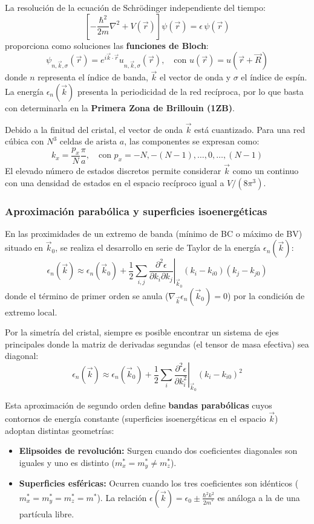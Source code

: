 La resolución de la ecuación de Schrödinger independiente del tiempo:
\[
\left[ -\frac{\hbar^2}{2m} \nabla^2 + V(\vec{r}) \right] \psi(\vec{r}) = \epsilon \, \psi(\vec{r})
\]
proporciona como soluciones las \textbf{funciones de Bloch}:
\[
\psi_{n,\vec{k},\sigma}(\vec{r}) = e^{i \vec{k} \cdot \vec{r}} u_{n,\vec{k},\sigma}(\vec{r}), \quad \text{con } u(\vec{r}) = u(\vec{r} + \vec{R})
\]
donde $n$ representa el índice de banda, $\vec{k}$ el vector de onda y $\sigma$ el índice de espín. La energía $\epsilon_n(\vec{k})$ presenta la periodicidad de la red recíproca, por lo que basta con determinarla en la \textbf{Primera Zona de Brillouin (1ZB)}.

Debido a la finitud del cristal, el vector de onda $\vec{k}$ está cuantizado. Para una red cúbica con $N^3$ celdas de arista $a$, las componentes se expresan como:
\[
k_x = \frac{p_x}{N} \frac{\pi}{a}, \quad \text{con } p_x = -N, -(N-1), \dots, 0, \dots, (N-1)
\]
El elevado número de estados discretos permite considerar $\vec{k}$ como un continuo con una densidad de estados en el espacio recíproco igual a $V / (8\pi^3)$.

\subsubsection{Aproximación parabólica y superficies isoenergéticas}
En las proximidades de un extremo de banda (mínimo de BC o máximo de BV) situado en $\vec{k}_0$, se realiza el desarrollo en serie de Taylor de la energía $\epsilon_n(\vec{k})$:
\[
\epsilon_n(\vec{k}) \approx \epsilon_n(\vec{k}_0) + \frac{1}{2} \sum_{i,j} \left. \frac{\partial^2 \epsilon}{\partial k_i \partial k_j} \right|_{\vec{k}_0} (k_i - k_{i0})(k_j - k_{j0})
\]
donde el término de primer orden se anula ($\nabla_{\vec{k}} \epsilon_n(\vec{k}_0) = 0$) por la condición de extremo local.

Por la simetría del cristal, siempre es posible encontrar un sistema de ejes principales donde la matriz de derivadas segundas (el tensor de masa efectiva) sea diagonal:
\[
\epsilon_n(\vec{k}) \approx \epsilon_n(\vec{k}_0) + \frac{1}{2} \sum_{i} \left. \frac{\partial^2 \epsilon}{\partial k_i^2} \right|_{\vec{k}_0} (k_i - k_{i0})^2
\]

Esta aproximación de segundo orden define \textbf{bandas parabólicas} cuyos contornos de energía constante (superficies isoenergéticas en el espacio $\vec{k}$) adoptan distintas geometrías:
\begin{itemize}
    \item \textbf{Elipsoides de revolución:} Surgen cuando dos coeficientes diagonales son iguales y uno es distinto ($m_x^* = m_y^* \neq m_z^*$).
    \item \textbf{Superficies esféricas:} Ocurren cuando los tres coeficientes son idénticos ($m_x^* = m_y^* = m_z^* = m^*$). La relación $\epsilon(\vec{k}) = \epsilon_0 \pm \frac{\hbar^2 k^2}{2m^*}$ es análoga a la de una partícula libre.
\end{itemize}

